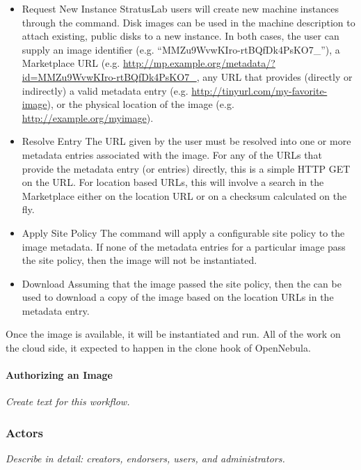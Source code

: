 \begin{itemize}

\item{Request New Instance} StratusLab users will create new machine
  instances through the  command.  Disk
  images can be used in the machine description to attach existing,
  public disks to a new instance.  In both cases, the user can supply
  an image identifier (e.g. ``MMZu9WvwKIro-rtBQfDk4PsKO7\_''), a
  Marketplace URL
  (e.g. \url{http://mp.example.org/metadata/?id=MMZu9WvwKIro-rtBQfDk4PsKO7\_},
  any URL that provides (directly or indirectly) a valid metadata
  entry (e.g. \url{http://tinyurl.com/my-favorite-image}), or the
  physical location of the image
  (e.g. \url{http://example.org/myimage}).

\item{Resolve Entry} The URL given by the user must be resolved into
  one or more metadata entries associated with the image.  For any of
  the URLs that provide the metadata entry (or entries) directly, this
  is a simple HTTP GET on the URL\@.  For location based URLs, this
  will involve a search in the Marketplace either on the location URL
  or on a checksum calculated on the fly.

\item{Apply Site Policy} The command  will
  apply a configurable site policy to the image metadata.  If none of
  the metadata entries for a particular image pass the site policy,
  then the image will not be instantiated.

\item{Download} Assuming that the image passed the site policy, then
  the  can be used to download a copy of
  the image based on the location URLs in the metadata entry.

\end{itemize}

Once the image is available, it will be instantiated and run.  All of
the work on the cloud side, it expected to happen in the clone hook of
OpenNebula\@.

\paragraph{Authorizing an Image}

{\em Create text for this workflow.}

\subsubsection{Actors}

{\em Describe in detail: creators, endorsers, users, and
  administrators.}

